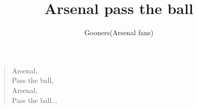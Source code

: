 \documentclass[a4paper,12pt]{article}
\title{Arsenal pass the ball}
\author{Gooners(Arsenal fans)}
\date{}
\begin{document}
	
	\maketitle
	
	\begin{verse}
		
		Arsenal, \\
		Pass the ball, \\
		Arsenal, \\
		Pass the ball$\ldots$
		
	\end{verse}
	
\end{document}
